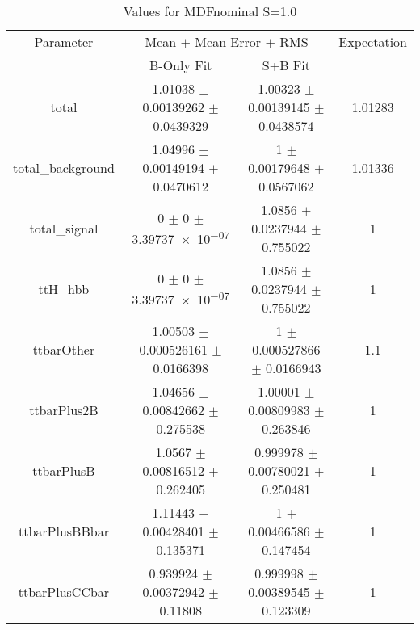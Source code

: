 \begin{table}
\centering
\caption{Values for MDFnominal S=1.0}
\begin{tabular}{cccc}
\toprule
Parameter & \multicolumn{2}{c}{Mean $\pm$ Mean Error $\pm$ RMS} & Expectation\\
 & B-Only Fit & S+B Fit & \\
\midrule
total & \num{1.01038} $\pm$ \num{0.00139262} $\pm$ \num{0.0439329} & \num{1.00323} $\pm$ \num{0.00139145} $\pm$ \num{0.0438574} & \num{1.01283}\\
total\_background & \num{1.04996} $\pm$ \num{0.00149194} $\pm$ \num{0.0470612} & \num{1} $\pm$ \num{0.00179648} $\pm$ \num{0.0567062} & \num{1.01336}\\
total\_signal & \num{0} $\pm$ \num{0} $\pm$ \num{3.39737e-07} & \num{1.0856} $\pm$ \num{0.0237944} $\pm$ \num{0.755022} & \num{1}\\
ttH\_hbb & \num{0} $\pm$ \num{0} $\pm$ \num{3.39737e-07} & \num{1.0856} $\pm$ \num{0.0237944} $\pm$ \num{0.755022} & \num{1}\\
ttbarOther & \num{1.00503} $\pm$ \num{0.000526161} $\pm$ \num{0.0166398} & \num{1} $\pm$ \num{0.000527866} $\pm$ \num{0.0166943} & \num{1.1}\\
ttbarPlus2B & \num{1.04656} $\pm$ \num{0.00842662} $\pm$ \num{0.275538} & \num{1.00001} $\pm$ \num{0.00809983} $\pm$ \num{0.263846} & \num{1}\\
ttbarPlusB & \num{1.0567} $\pm$ \num{0.00816512} $\pm$ \num{0.262405} & \num{0.999978} $\pm$ \num{0.00780021} $\pm$ \num{0.250481} & \num{1}\\
ttbarPlusBBbar & \num{1.11443} $\pm$ \num{0.00428401} $\pm$ \num{0.135371} & \num{1} $\pm$ \num{0.00466586} $\pm$ \num{0.147454} & \num{1}\\
ttbarPlusCCbar & \num{0.939924} $\pm$ \num{0.00372942} $\pm$ \num{0.11808} & \num{0.999998} $\pm$ \num{0.00389545} $\pm$ \num{0.123309} & \num{1}\\
\bottomrule
\end{tabular}
\end{table}